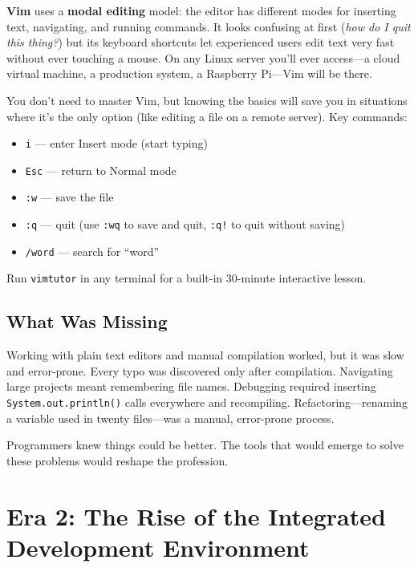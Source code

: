 \documentclass[11pt,letterpaper]{article}
\newcommand{\keyterm}[1]{\textbf{\textcolor{cssecondary}{#1}}}
\begin{document}
\textbf{Vim} uses a \keyterm{modal editing} model: the editor has different modes for inserting text, navigating, and running commands. It looks confusing at first (\textit{how do I quit this thing?}) but its keyboard shortcuts let experienced users edit text very fast without ever touching a mouse. On any Linux server you'll ever access---a cloud virtual machine, a production system, a Raspberry Pi---Vim will be there.

\begin{tipbox}
You don't need to master Vim, but knowing the basics will save you in situations where it's the only option (like editing a file on a remote server). Key commands:
\begin{itemize}[itemsep=2pt]
    \item \texttt{i} --- enter Insert mode (start typing)
    \item \texttt{Esc} --- return to Normal mode
    \item \texttt{:w} --- save the file
    \item \texttt{:q} --- quit (use \texttt{:wq} to save and quit, \texttt{:q!} to quit without saving)
    \item \texttt{/word} --- search for ``word''
\end{itemize}
Run \texttt{vimtutor} in any terminal for a built-in 30-minute interactive lesson.
\end{tipbox}

\subsection{What Was Missing}

Working with plain text editors and manual compilation worked, but it was slow and error-prone. Every typo was discovered only after compilation. Navigating large projects meant remembering file names. Debugging required inserting \texttt{System.out.println()} calls everywhere and recompiling. Refactoring---renaming a variable used in twenty files---was a manual, error-prone process.

Programmers knew things could be better. The tools that would emerge to solve these problems would reshape the profession.

\section{Era 2: The Rise of the Integrated Development Environment}
\end{document}
